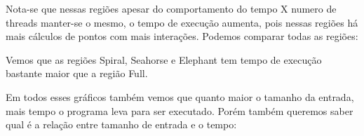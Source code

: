 \documentclass[12pt]{article}
\begin{document}
Nota-se que nessas regiões apesar do comportamento do tempo X numero de threads manter-se o mesmo, o tempo de execução aumenta, pois nessas regiões há mais cálculos de pontos com mais interações. Podemos comparar todas as regiões:

\begin{figure}[H]
\end{figure}

Vemos que as regiões Spiral, Seahorse e Elephant tem tempo de execução bastante maior que a região Full.

Em todos esses gráficos também vemos que quanto maior o tamanho da entrada, mais tempo o programa leva para ser executado. Porém também queremos saber qual é a relação entre tamanho de entrada e o tempo:

\begin{figure}[H]
\end{figure}
\end{document}
